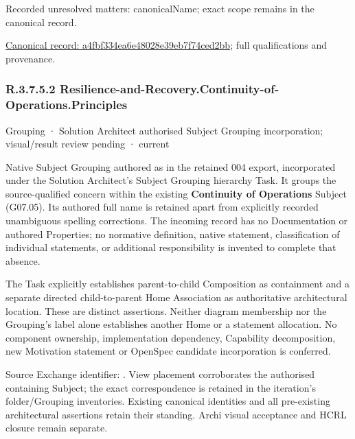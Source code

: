 {\small Recorded unresolved matters: canonicalName; exact scope remains in the canonical record.}\par
{\footnotesize \href{../../../../continuum/grouping/a4fbf334ea6e48028e39eb7f74ced2bb.md}{Canonical record: a4fbf334ea6e48028e39eb7f74ced2bb}; full qualifications and provenance.}\par
\subsubsection*{R.3.7.5.2 Resilience-and-Recovery.Continuity-of-Operations.Principles}
\label{navigation:R.3.7.5.2}

\label{element:aba77f43a26440dfb5e7cd67934e7ebd}
{\small Grouping · Solution Architect authorised Subject Grouping incorporation; visual/result review pending · current}\par

Native Subject Grouping authored as \texttt{} in the retained 004 export,
incorporated under the Solution Architect's Subject Grouping hierarchy Task.
It groups the source-qualified \texttt{} concern within
the existing \textbf{Continuity of Operations} Subject (G07.05). Its authored full name
is retained apart from explicitly recorded unambiguous spelling corrections.
The incoming record has no Documentation or authored Properties; no normative
definition, native statement, classification of individual statements, or
additional responsibility is invented to complete that absence.



The Task explicitly establishes parent-to-child Composition as containment and
a separate directed child-to-parent Home Association as authoritative architectural
location. These are distinct assertions. Neither diagram membership nor the
Grouping's label alone establishes another Home or a statement allocation.
No component ownership, implementation dependency, Capability decomposition,
new Motivation statement or OpenSpec candidate incorporation is conferred.



Source Exchange identifier: \texttt{}. View placement corroborates
the authorised containing Subject; the exact correspondence is retained in the
iteration's folder/Grouping inventories. Existing canonical identities and all
pre-existing architectural assertions retain their standing. Archi visual
acceptance and HCRL closure remain separate.


